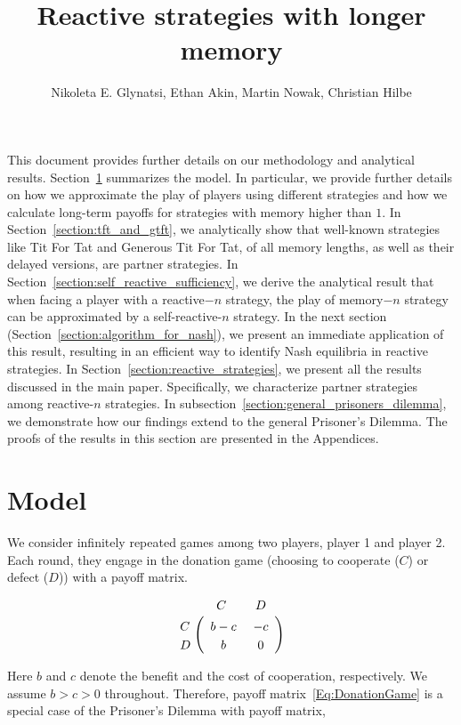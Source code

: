 \documentclass{article}
\title{Reactive strategies with longer memory}
\author{Nikoleta E. Glynatsi, Ethan Akin, Martin Nowak, Christian Hilbe}
\date{}
\theoremstyle{definition}
\begin{document}
\maketitle

This document provides further details on our methodology and analytical
results. Section~\ref{section:model} summarizes the model. In particular, we
provide further details on how we approximate the play of players using
different strategies and how we calculate long-term payoffs for strategies with
memory higher than $1$. In Section~\ref{section:tft_and_gtft}, we analytically
show that well-known strategies like Tit For Tat and Generous Tit For Tat, of
all memory lengths, as well as their delayed versions, are partner strategies.
In Section~\ref{section:self_reactive_sufficiency}, we derive the analytical
result that when facing a player with a reactive$-n$ strategy, the play of
memory$-n$ strategy can be approximated by a self-reactive-$n$ strategy. In the
next section (Section~\ref{section:algorithm_for_nash}), we present an immediate
application of this result, resulting in an efficient way to identify Nash
equilibria in reactive strategies. In Section~\ref{section:reactive_strategies},
we present all the results discussed in the main paper. Specifically, we
characterize partner strategies among reactive-$n$ strategies. In
subsection~\ref{section:general_prisoners_dilemma}, we demonstrate how our
findings extend to the general Prisoner's Dilemma. The proofs of the results in
this section are presented in the Appendices.



\section{Model}\label{section:model}

We consider infinitely repeated games among two players, player 1 and player 2.
Each round, they engage in the donation game (choosing to cooperate ($C$) or
defect ($D$)) with a payoff matrix.


\begin{align} \label{Eq:DonationGame}
  \bordermatrix{%
    & C & D \cr
    C &\ b - c &\ -c\  \cr
    D &\ b &\ 0\ \cr
  }
\end{align}

Here $b$ and $c$ denote the benefit and the cost of cooperation, respectively. 
We assume $b\!>\!c\!>\!0$ throughout.
Therefore, payoff matrix~\eqref{Eq:DonationGame} is a special case of the
Prisoner's Dilemma with payoff matrix,
\end{document}
